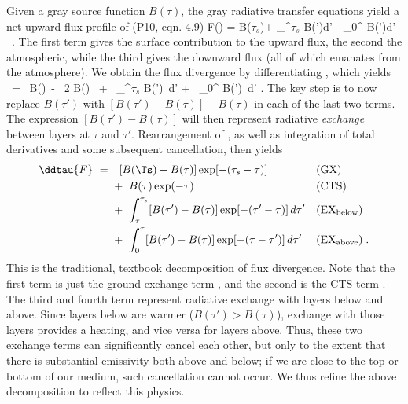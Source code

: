 \documentclass[10pt]{article}
\newcommand{\taus}{\ensuremath{\tau_s}}
\newcommand{\EXbelow}{\ensuremath{\mathrm{EX_{below}}}}
\newcommand{\EXabove}{\ensuremath{\mathrm{EX_{above}}}}
\begin{document}
Given a gray source function $B(\tau)$,  the gray radiative transfer equations yield a net upward flux profile of (P10, eqn. 4.9)
\beqn
	F(\tau) = B(\taus)\exp[-(\taus-\tau)] + \int_{\tau}^{\taus} B(\tau') d\tau' - \int_0^{\tau} B(\tau')d\tau' \ .
	\label{F_tau}
\eeqn 
The first term gives the surface contribution to the upward flux, the second the atmospheric, while the third gives the downward flux (all of which emanates from the atmosphere). We obtain the flux divergence by differentiating , which yields
	\beqn
		 \ = \  B(\Ts)\exp[-(\taus-\tau)] \ - \ 2  B(\tau) \
									+ \  \int_\tau^{\taus} B(\tau') \, d\tau' 
									+ \  \int_0^{\tau} B(\tau') \, d\tau'  \; .
		\label{ddtau_Ftau}
	\eeqn
The key step is to now replace $B(\tau')$ with $[B(\tau')-B(\tau)]+B(\tau)$ in each of the last two terms. The expression  $[B(\tau')-B(\tau)]$ will then represent radiative \emph{exchange} between layers at $\tau$ and $\tau'$.  Rearrangement of , as well as integration of total derivatives and some subsequent cancellation, then yields
	\begin{subequations}
	\begin{align}
			\ddtau{F} \ =\  & \ \   [B(\Ts)-B(\tau)]\exp[-(\taus-\tau)] 
											&& \text{(GX)}  \label{exch_surf} \\
								& +\  B(\tau)\exp(-\tau)
											& & \text{(CTS)} \label{cts_term} \\
								& +\ \int_\tau^{\taus} [B(\tau')-B(\tau)]\exp[-(\tau'-\tau)] \, d\tau' 
											& &(\EXbelow)  \label{exch_below}  \\
								& +\  \int_0^{\tau} [B(\tau')-B(\tau)]\exp[-(\tau-\tau')] \, d\tau'  
											& &(\EXabove) \; .  \label{exch_above} 
		\end{align}
		\label{cts_full}
	\end{subequations}
	This is the traditional, textbook decomposition of flux divergence. Note that the first term is just the ground exchange term , and the second is the CTS term . The third and fourth term represent radiative exchange  with layers below and above. Since layers below are warmer ($B(\tau')>B(\tau)$), exchange with those layers provides a heating, and vice versa for layers above. Thus, these two exchange terms can significantly cancel each other, but only to the extent that there is substantial emissivity both above and below; if we are close to the top or bottom of our medium, such cancellation cannot occur. We thus refine the above decomposition to reflect this physics.
	
\end{document}
